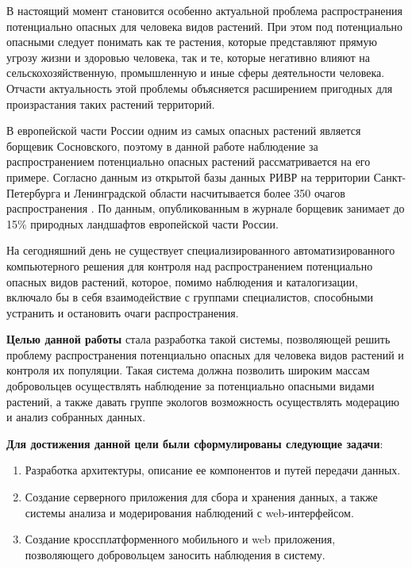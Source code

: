 

\tab
В настоящий момент становится особенно актуальной проблема распространения потенциально опасных для человека видов растений.
При этом под потенциально опасными следует понимать как те растения, которые представляют прямую угрозу жизни и здоровью человека, так и те, которые негативно влияют на сельскохозяйственную, промышленную и иные сферы деятельности человека\cite{alien-plants}.
Отчасти актуальность этой проблемы объясняется расширением пригодных для произрастания таких растений территорий\cite{invasive-plants}.

\tab
В европейской части России одним из самых опасных растений является борщевик Сосновского\cite{heracleum}, поэтому в данной работе наблюдение за распространением потенциально опасных растений рассматривается на его примере.
Согласно данным из открытой базы данных РИВР\cite{rivr} на территории Санкт-Петербурга и Ленинградской области насчитывается более 350 очагов распространения .
По данным, опубликованным в журнале \cite{esquire} борщевик занимает до 15\% природных ландшафтов европейской части России.

\tab
На сегодняшний день не существует специализированного автоматизированного компьютерного решения для контроля над распространением потенциально опасных видов растений, которое, помимо наблюдения и каталогизации, включало бы в себя взаимодействие с группами специалистов, способными устранить и остановить очаги распространения.

\tab
\textbf{Целью данной работы} стала разработка такой системы, позволяющей решить проблему распространения потенциально опасных для человека видов растений и контроля их популяции.
Такая система должна позволить широким массам добровольцев осуществлять наблюдение за потенциально опасными видами растений, а также давать группе экологов возможность осуществлять модерацию и анализ собранных данных.

\tab
\textbf{Для достижения данной цели были сформулированы следующие задачи}:
\begin{enumerate}
	\item Разработка архитектуры, описание ее компонентов и путей передачи данных.
	\item Создание серверного приложения для сбора и хранения данных, а также системы анализа и модерирования наблюдений с web-интерфейсом.
	\item Создание кроссплатформенного мобильного и web приложения, позволяющего добровольцем заносить наблюдения в систему.
\end{enumerate}

